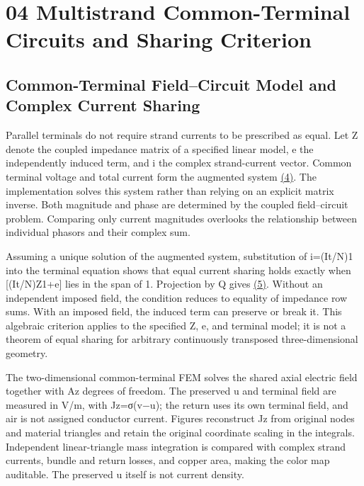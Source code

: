 \documentclass[11pt]{article}
\begin{document}
\section*{04 Multistrand Common-Terminal Circuits and Sharing Criterion}
\hypertarget{chapter-04}{}
\subsection*{Common-Terminal Field–Circuit Model and Complex Current Sharing}
\hypertarget{04.common.heading}{}
Parallel terminals do not require strand currents to be prescribed as equal. Let Z denote the coupled impedance matrix of a specified linear model, e the independently induced term, and i the complex strand-current vector. Common terminal voltage and total current form the augmented system \href{report_en_single.pdf#E04}{(4)}. The implementation solves this system rather than relying on an explicit matrix inverse. Both magnitude and phase are determined by the coupled field–circuit problem. Comparing only current magnitudes overlooks the relationship between individual phasors and their complex sum.


Assuming a unique solution of the augmented system, substitution of i=(It/N)1 into the terminal equation shows that equal current sharing holds exactly when [(It/N)Z1+e] lies in the span of 1. Projection by Q gives \href{report_en_single.pdf#E05}{(5)}. Without an independent imposed field, the condition reduces to equality of impedance row sums. With an imposed field, the induced term can preserve or break it. This algebraic criterion applies to the specified Z, e, and terminal model; it is not a theorem of equal sharing for arbitrary continuously transposed three-dimensional geometry.


The two-dimensional common-terminal FEM solves the shared axial electric field together with Az degrees of freedom. The preserved u and terminal field are measured in V/m, with Jz=σ(v−u); the return uses its own terminal field, and air is not assigned conductor current. Figures reconstruct Jz from original nodes and material triangles and retain the original coordinate scaling in the integrals. Independent linear-triangle mass integration is compared with complex strand currents, bundle and return losses, and copper area, making the color map auditable. The preserved u itself is not current density.
\end{document}
